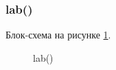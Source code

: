 \subsubsection{lab()}

Блок-схема на рисунке \ref{fig:lab}.

\begin{figure}[h]
    \caption{lab()}
    \label{fig:lab}
\end{figure}





\newpage